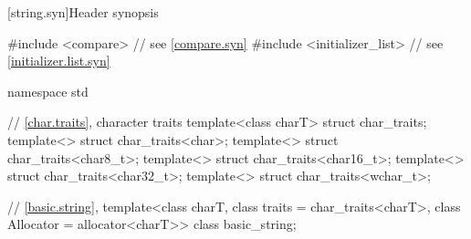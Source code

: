 [string.syn]{Header  synopsis}
%

\begin{codeblock}
#include <compare>              // see \ref{compare.syn}
#include <initializer_list>     // see \ref{initializer.list.syn}

namespace std {
  // \ref{char.traits}, character traits
  template<class charT> struct char_traits;
  template<> struct char_traits<char>;
  template<> struct char_traits<char8_t>;
  template<> struct char_traits<char16_t>;
  template<> struct char_traits<char32_t>;
  template<> struct char_traits<wchar_t>;

  // \ref{basic.string}, 
  template<class charT, class traits = char_traits<charT>, class Allocator = allocator<charT>>
    class basic_string;

}
\end{codeblock}

